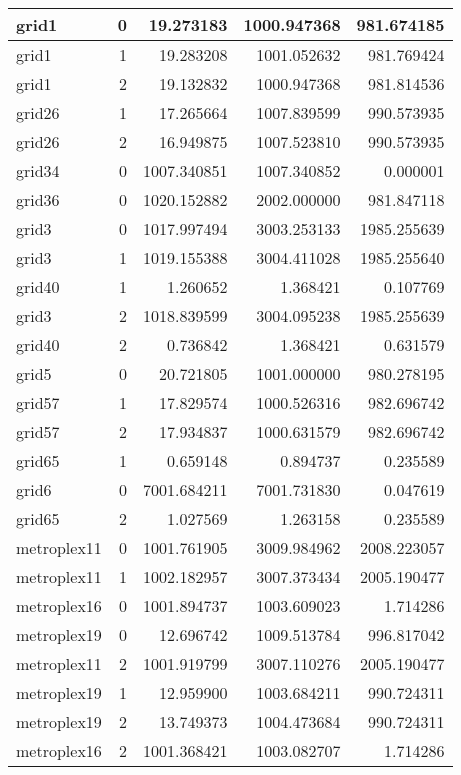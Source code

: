 \documentclass[../../../thesis.tex]{subfiles}
\begin{document}
\begin{longtable}{|l|r|r|r|r|}
\endfoot
\endlastfoot
grid1 & 0 & 19.273183 & 1000.947368 & 981.674185 \\\hline
grid1 & 1 & 19.283208 & 1001.052632 & 981.769424 \\\hline
grid1 & 2 & 19.132832 & 1000.947368 & 981.814536 \\\hline
grid26 & 1 & 17.265664 & 1007.839599 & 990.573935 \\\hline
grid26 & 2 & 16.949875 & 1007.523810 & 990.573935 \\\hline
grid34 & 0 & 1007.340851 & 1007.340852 & 0.000001 \\\hline
grid36 & 0 & 1020.152882 & 2002.000000 & 981.847118 \\\hline
grid3 & 0 & 1017.997494 & 3003.253133 & 1985.255639 \\\hline
grid3 & 1 & 1019.155388 & 3004.411028 & 1985.255640 \\\hline
grid40 & 1 & 1.260652 & 1.368421 & 0.107769 \\\hline
grid3 & 2 & 1018.839599 & 3004.095238 & 1985.255639 \\\hline
grid40 & 2 & 0.736842 & 1.368421 & 0.631579 \\\hline
grid5 & 0 & 20.721805 & 1001.000000 & 980.278195 \\\hline
grid57 & 1 & 17.829574 & 1000.526316 & 982.696742 \\\hline
grid57 & 2 & 17.934837 & 1000.631579 & 982.696742 \\\hline
grid65 & 1 & 0.659148 & 0.894737 & 0.235589 \\\hline
grid6 & 0 & 7001.684211 & 7001.731830 & 0.047619 \\\hline
grid65 & 2 & 1.027569 & 1.263158 & 0.235589 \\\hline
metroplex11 & 0 & 1001.761905 & 3009.984962 & 2008.223057 \\\hline
metroplex11 & 1 & 1002.182957 & 3007.373434 & 2005.190477 \\\hline
metroplex16 & 0 & 1001.894737 & 1003.609023 & 1.714286 \\\hline
metroplex19 & 0 & 12.696742 & 1009.513784 & 996.817042 \\\hline
metroplex11 & 2 & 1001.919799 & 3007.110276 & 2005.190477 \\\hline
metroplex19 & 1 & 12.959900 & 1003.684211 & 990.724311 \\\hline
metroplex19 & 2 & 13.749373 & 1004.473684 & 990.724311 \\\hline
metroplex16 & 2 & 1001.368421 & 1003.082707 & 1.714286 \\\hline

\end{longtable}
\end{document}

